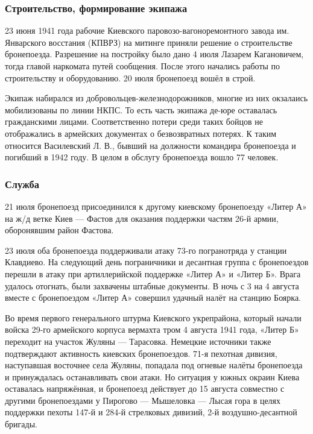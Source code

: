 \begin{multicols}{3}

\small
\footnotesize
\subsubsection{Строительство, формирование экипажа}

23 июня 1941 года рабочие Киевского паровозо-вагоноремонтного завода им.
Январского восстания (КПВРЗ) на митинге приняли решение о строительстве
бронепоезда. Разрешение на постройку было дано 4 июля Лазарем Кагановичем,
тогда главой наркомата путей сообщения\cite{Kolomiec100}. После этого начались работы по
строительству и оборудованию. 20 июля бронепоезд вошёл в строй\cite{Kajnaran2012,Kolomiec100}.

Экипаж набирался из добровольцев-железнодорожников, многие из них окзалаись
мобилизованы по линии НКПС. То есть часть экипажа де-юре оставалась
гражданскими лицами. Соответственно потери среди таких бойцов не отображались в
армейских документах о безвозвратных потерях. К таким относится Василевский Л.
В., бывший на должности командира бронепоезда и погибший в 1942 году. В целом в
обслугу бронепоезда вошло 77 человек\cite{Kajnaran2012}. 


\subsubsection{Служба}

21 июля бронепоезд присоединился к другому киевскому бронепоезду «Литер А» на
ж/д ветке Киев — Фастов для оказания поддержки частям 26-й армии, оборонявшим
район Фастова\cite{Kajnaran2012}.

23 июля оба бронепоезда поддерживали атаку 73-го погранотряда у станции
Клавдиево. На следующий день пограничники и десантная группа с бронепоездов
перешли в атаку при артиллерийской поддержке «Литер А» и «Литер Б». Врага
удалось отогнать, были захвачены штабные документы. В ночь с 3 на 4 августа
вместе с бронепоездом «Литер А» совершил удачный налёт на станцию
Боярка\cite{Kajnaran2012}.

Во время первого генерального штурма Киевского укрепрайона, который начали
войска 29-го армейского корпуса вермахта тром 4 августа 1941
года\cite{KajnaranMuravovJuschenko2017}, «Литер Б» переходит на участок Жуляны
— Тарасовка\cite{Kajnaran2012}. Немецкие источники также подтверждают
активность киевских бронепоездов. 71-я пехотная дивизия, наступавшая восточнее
села Жуляны, попадала под огневые налёты бронепоезда и принуждалась
останавливать свои атаки\cite{Haupt2007}. Но ситуация у южных окраин Киева
оставалась напряжённая, и бронепоезд действует до 15 августа совместно с
другими бронепоездами у Пирогово — Мышеловка — Лысая гора в целях поддержки
пехоты 147-й и 284-й стрелковых дивизий, 2-й воздушно-десантной
бригады\cite{KajnaranMuravovJuschenko2017}.


\end{multicols}
